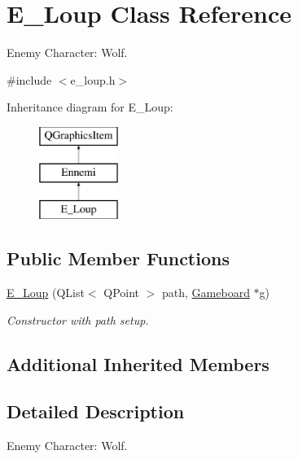 \hypertarget{class_e___loup}{}\section{E\+\_\+\+Loup Class Reference}
\label{class_e___loup}


Enemy Character\+: Wolf.  




{\ttfamily \#include $<$e\+\_\+loup.\+h$>$}

Inheritance diagram for E\+\_\+\+Loup\+:\begin{figure}[H]
\begin{center}
\leavevmode
\includegraphics[height=3.000000cm]{class_e___loup}
\end{center}
\end{figure}
\subsection*{Public Member Functions}
\begin{DoxyCompactItemize}
\item 
\hyperlink{class_e___loup_a93c72a161ae4093e7bb9ab7d495ca555}{E\+\_\+\+Loup} (Q\+List$<$ Q\+Point $>$ path, \hyperlink{class_gameboard}{Gameboard} $\ast$g)
\begin{DoxyCompactList}\small\item\em Constructor with path setup. \end{DoxyCompactList}\end{DoxyCompactItemize}
\subsection*{Additional Inherited Members}


\subsection{Detailed Description}
Enemy Character\+: Wolf. 

